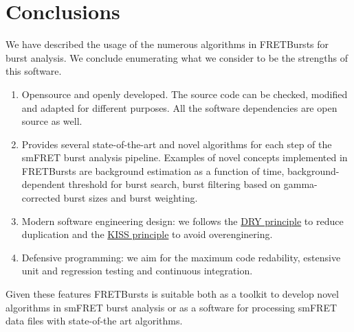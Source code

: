 \section{Conclusions}
\label{sec:conclusions}

We have described the usage of the numerous algorithms in FRETBursts
for burst analysis. We conclude enumerating what we consider to be the strengths
of this software.

\begin{enumerate}
\item Opensource and openly developed. The source code can be checked, modified and
adapted for different purposes. All the software dependencies are open source as well.
\item Provides several state-of-the-art and novel algorithms for each step of the 
smFRET burst analysis pipeline. Examples of novel concepts implemented in FRETBursts are background estimation as a function of time,
background-dependent threshold for burst search, burst filtering based on 
gamma-corrected burst sizes and burst weighting.
\item Modern software engineering design: we follows the \href{http://en.wikipedia.org/wiki/Don\%27t_repeat_yourself}{DRY principle} to reduce duplication and the \href{http://en.wikipedia.org/wiki/KISS_principle}{KISS principle} to avoid overenginering.
\item Defensive programming: we aim for the maximum code redability,
estensive unit and regression testing and continuous integration.
\end{enumerate}

Given these features FRETBursts is suitable both as a toolkit to develop novel algorithms
in smFRET burst analysis or as a software for processing smFRET data files with
state-of-the art algorithms.
